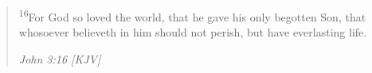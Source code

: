 \begin{quote}
\textsuperscript{16}For God so loved the world, that he gave his only begotten Son, that whosoever believeth in him should not perish, but have everlasting life.
\begin{flushright}
\emph{John 3:16 [KJV]}
\end{flushright}
\end{quote}